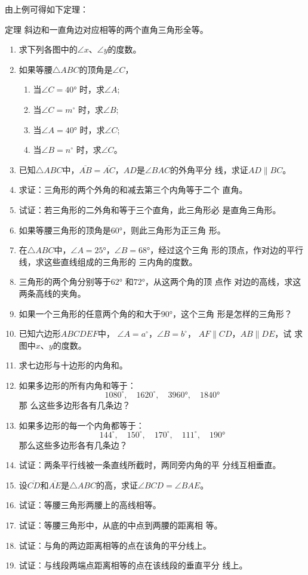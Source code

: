 由上例可得如下定理：

\begin{Theorem}{定理}
斜边和一直角边对应相等的两个直角三角形全等。  
\end{Theorem}

\begin{Practice}
\begin{enumerate}
    \item 求下列各图中的$\angle x$、$\angle y$的度数。
    \item 如果等腰$\triangle ABC$的顶角是$\angle C$，
\begin{enumerate}
\item 当$\angle C=\ang{40}$ 时，求$\angle A$;
\item 当$\angle C=m^{\circ}$ 时，求$\angle B$;
\item 当$\angle A=\ang{40}$ 时，求$\angle C$;
\item 当$\angle B=n^{\circ}$ 时，求$\angle C$。
\end{enumerate}

\item 已知$\triangle ABC$中，$\overline{AB}=\overline{AC}$，$AD$是$\angle BAC$的外角平分
    线，求证$AD\parallel BC$。
\item 求证：三角形的两个外角的和减去第三个内角等于二个
直角。
\item 试证：若三角形的二外角和等于三个直角，此三角形必
是直角三角形。
\item 如果等腰三角形的顶角是$\ang{60}$，则此三角形为正三角
形。
\item 在$\triangle ABC$中，$\angle A=\ang{25}$，$\angle B=\ang{68}$，经过这个三角
形的顶点，作对边的平行线，求这些直线组成的三角形的
三内角的度数。
\item 三角形的两个角分别等于$\ang{62}$ 和$\ang{72}$，从这两个角的顶
点作
对边的高线，求这两条高线的夹角。
\item 如果一个三角形的任意两个角的和大于$\ang{90}$，这个三角
形是怎样的三角形？
\item 已知六边形$ABCDEF$中，
$\angle A=a^{\circ}$，$\angle B=b^{\circ}$，
$AF\parallel CD$，$AB\parallel DE$，试
求图中$x$、$y$的度数。
\item 求七边形与十边形的内角和。
\item 如果多边形的所有内角和等于：
\[1080^{\circ} ,\quad 1620^{\circ}  ,\quad \ang{3960}  ,\quad \ang{1840}\]那
么这些多边形各有几条边？
\item 如果多边形的每一个内角都等于：
\[144^{\circ} ,\quad 150^{\circ}  ,\quad 170^{\circ}  ,\quad 111^{\circ} 
,\quad \ang{190}\] 
那么这些多边形各有几条边？
\item 试证：两条平行线被一条直线所截时，两同旁内角的平
分线互相垂直。
\item 设$\overline{CD}$和$\overline{AE}$是$\triangle ABC$的高，求证$\angle BCD=\angle BAE$。
\item 试证：等腰三角形两腰上的高线相等。
\item 试证：等腰三角形中，从底的中点到两腰的距离相
等。
\item 试证：与角的两边距离相等的点在该角的平分线上。
\item 试证：与线段两端点距离相等的点在该线段的垂直平分
线上。
\end{enumerate}
\end{Practice}

